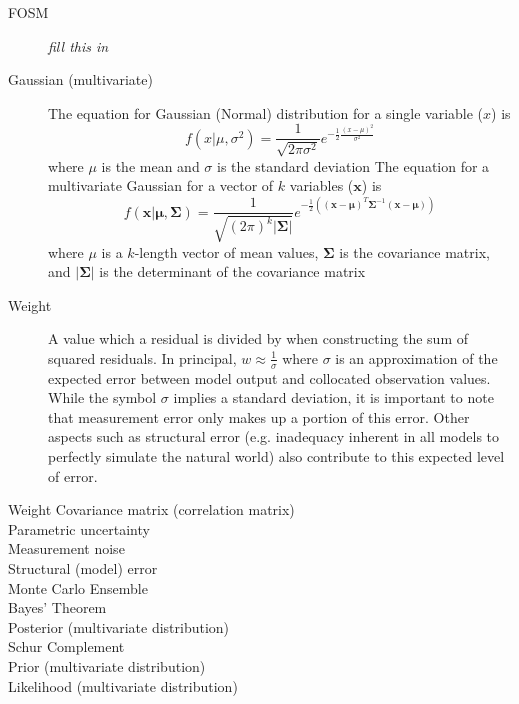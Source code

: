 \documentclass[english]{article}
\begin{document}
\begin{description}
\item [FOSM] \emph{fill this in}
\item [Gaussian (multivariate)] The equation for Gaussian (Normal) distribution for a single variable ($x$) is 
\begin{equation}
f(x|\mu,\sigma^2)=\frac{1}{\sqrt{2\pi\sigma^2}}e^{-\frac{1}{2}\frac{\left(x-\mu\right)^2}{\sigma^2}}
\end{equation}
where $\mu$ is the mean and $\sigma$ is the standard deviation
The equation for a multivariate Gaussian for a vector of $k$ variables ($\mathbf{x}$) is
\begin{equation}
f(\mathbf{x} | \mathbf{\mu},\mathbf{\Sigma})=\frac{1}{\sqrt{(2\pi)^k\left|\mathbf{\Sigma}\right|}}e^{-\frac{1}{2}\left( \left(\mathbf{x}-\mathbf{\mu} \right)^T  \mathbf{\Sigma}^{-1}\left(\mathbf{x}-\mathbf{\mu} \right)\right)}
\end{equation}
where $\mu$ is a $k$-length vector of mean values, $\mathbf{\Sigma}$ is the covariance matrix, and $\left|\mathbf{\Sigma}\right|$ is the determinant of the covariance matrix
\item [Weight] A value which a residual is divided by when constructing the sum of squared residuals. In principal, $w\approx\frac{1}{\sigma}$ where $\sigma$ is an approximation of the expected error between model output and collocated observation values. While the symbol $\sigma$ implies a standard deviation, it is important to note that measurement error only makes up a portion of this error. Other aspects such as structural error (e.g. inadequacy inherent in all models to perfectly simulate the natural world) also contribute to this expected level of error.
\item [Weight Covariance matrix (correlation matrix)]
\item [Parametric uncertainty]
\item [Measurement noise]
\item [Structural (model) error]
\item [Monte Carlo Ensemble]
\item [Bayes' Theorem]
\item [Posterior (multivariate distribution)]
\item [Schur Complement]
\item [Prior (multivariate distribution)]
\item [Likelihood (multivariate distribution)] 

\end{description}
\end{document}
